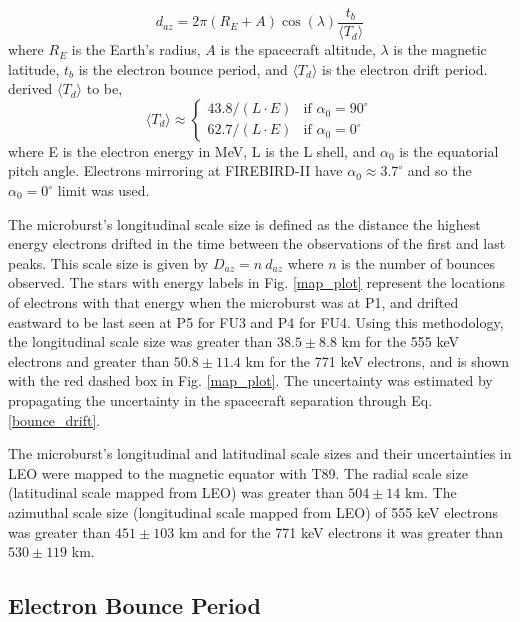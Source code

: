 \documentclass[draft, linenumbers]{agujournal}
\begin{document}
\begin{equation}
d_{az} = 2 \pi (R_E + A) \cos(\lambda) \frac{t_b}{\langle T_{d} \rangle}
\label{bounce_drift}
\end{equation} where $R_E$ is the Earth's radius, $A$ is the spacecraft altitude, $\lambda$ is the magnetic latitude, $t_b$ is the electron bounce period, and $\langle T_{d} \rangle$ is the electron drift period. \citet{Parks2003} derived $\langle T_{d} \rangle$ to be,
\begin{equation}
\langle T_{d} \rangle \approx
\begin{cases}
43.8 /(L \cdot E) & \text{if } \alpha_0 = 90^{\circ} \\    62.7/(L \cdot E) & \text{if } \alpha_0 = 0^{\circ}
\end{cases}
\label{drift}
\end{equation} where E is the electron energy in MeV, L is the L shell, and $\alpha_0$ is the equatorial pitch angle. Electrons mirroring at FIREBIRD-II have $\alpha_0 {\approx} 3.7^{\circ}$ and so the $\alpha_0 = 0^{\circ}$ limit was used.

The microburst's longitudinal scale size is defined as the distance the highest energy electrons drifted in the time between the observations of the first and last peaks. This scale size is given by $D_{az} = n \ d_{az}$ where $n$ is the number of bounces observed. The stars with energy labels in Fig. \ref{map_plot} represent the locations of electrons with that energy when the microburst was  at P1, and drifted eastward to be last seen at P5 for FU3 and P4 for FU4. Using this methodology, the  longitudinal scale size was  greater than $ 38.5 \pm 8.8$ km for the 555 keV electrons and greater than $ 50.8 \pm 11.4$ km for the 771 keV electrons, and is shown with the red dashed box in Fig. \ref{map_plot}. The uncertainty was estimated by propagating the uncertainty in the spacecraft separation through Eq. \ref{bounce_drift}.

The microburst's longitudinal and latitudinal scale sizes and their uncertainties in LEO were mapped to the magnetic equator with T89. The radial scale size (latitudinal scale mapped from LEO) was greater than $504 \pm​ 14$ km. The azimuthal scale size (longitudinal scale mapped from LEO) of 555 keV electrons was greater than $451 \pm 103$ km and for the 771 keV electrons it was greater than $530 \pm 119$ km.

\subsection{Electron Bounce Period} \label{t_b} %
\end{document}
